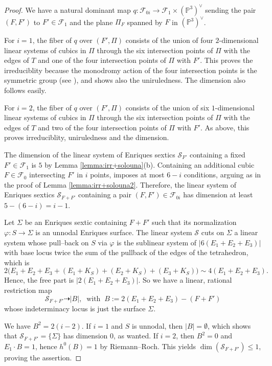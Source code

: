 \documentclass[11pt]{amsart}
\theoremstyle{definition}
\def\PP{{\mathbb P}}
\def\F{{\mathcal F}}
\def\x{\times}                   %
\begin{document}
\begin{proof}
  We have a natural dominant map $q:\F_{0i} \to \F_1 \x (\PP^3)^{\vee}$ sending the pair $(F,F')$ to $F' \in \F_1$ and the plane $\Pi_F$ spanned by $F$ in $(\PP^3)^{\vee}$. 

For $i=1$, the fiber of $q$ over $(F',\Pi)$  consists of the union of four $2$-dimensional linear systems of cubics in $\Pi$ through the six intersection points of $\Pi$ with the edges of $T$ and one of the four intersection points of $\Pi$ with $F'$. This proves the irreduciblity because  the monodromy action of the four intersection points is the symmetric group \color{black}(see \cite[Lemma on p. 111]{ACGH}), \color{black} and shows also the uniruledness. The dimension also follows easily. 


For $i=2$, the fiber of $q$ over $(F',\Pi)$  consists of the union of six $1$-dimensional linear systems of cubics in $\Pi$ through the six intersection points of $\Pi$ with the edges of $T$ and two of the four intersection points of $\Pi$ with $F'$. As above, this  proves  irreduciblity, uniruledness and the dimension.

The dimension of the linear system of Enriques sextics $\mathcal{S}_{F'}$ containing a fixed $F' \in \F_1$ is $5$ by Lemma \ref{lemma:irr+solouna}(b). Containing an additional cubic $F \in \F_0$ intersecting $F'$ in $i$ points, imposes at most $6-i$ conditions, arguing as in the proof of Lemma \ref{lemma:irr+solouna2}. Therefore, the linear system of Enriques sextics $\mathcal{S}_{F+F'}$ containing a pair $(F,F') \in \F_{0i}$ has dimension at least $5-(6-i)=i-1$.

Let $\Sigma$ be an Enriques sextic containing $F +F'$  such that its normalization $\varphi: S\to \Sigma$ is an  unnodal  Enriques surface.  
The linear system $\mathcal{S}$ cuts on $\Sigma$ a linear system whose pull--back on $S$ via $\varphi$  is the sublinear system of $|6(E_1+E_2+E_3)|$ with base locus twice the sum of the pullback of the edges of the tetrahedron, which is 
\[2\Big(E_1+E_2+E_3+(E_1+K_S)+(E_2+K_S)+(E_3+K_S)\Big) \sim 4(E_1+E_2+E_3).\]
Hence, the free part is
$|2(E_1+E_2+E_3)|$. So we have a  linear, rational restriction  map 
\[
\mathcal{S}_{F+F'}\dasharrow   |B|, \; \; \mbox{with} \; \; B:=2(E_1+E_2+E_3)-(F+F')
\]
 whose indeterminacy locus is just the surface $\Sigma$.

We have  $B^2=2(i-2)$. If  $i=1$ and $S$ is  unnodal, then  $|B|=\emptyset$,   which shows that $\mathcal{S}_{F+F'}=\{\Sigma\}$ has dimension 0, as wanted.  If $i=2$, then $B^2=0$ and $E_1 \cdot B=1$, hence $h^0(B)=1$ by
Riemann--Roch.   This yields
$\dim(\mathcal{S}_{F+F'})\leqslant 1$, proving the assertion. 
\end{proof}
\end{document}
